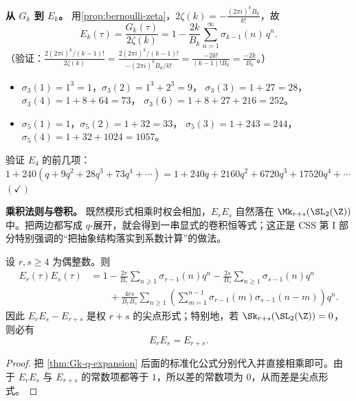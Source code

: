 \textbf{从 $G_k$ 到 $E_k$。}
用\cref{prop:bernoulli-zeta}，$2\zeta(k) = -\frac{(2\pi i)^k B_k}{k!}$，故
\[
  E_k(\tau)
  = \frac{G_k(\tau)}{2\zeta(k)}
  = 1 - \frac{2k}{B_k} \sum_{n=1}^{\infty} \sigma_{k-1}(n)\, q^n.
\]
（验证：$\frac{2(2\pi i)^k/(k-1)!}{2\zeta(k)} = \frac{2(2\pi i)^k/(k-1)!}{-(2\pi i)^k B_k/k!}
= \frac{-2k!}{(k-1)! B_k} = \frac{-2k}{B_k}$。）

\begin{example}
\label{ex:sigma-computation}
\leavevmode
\begin{itemize}
  \item $\sigma_3(1) = 1^3 = 1$，$\sigma_3(2) = 1^3 + 2^3 = 9$，
    $\sigma_3(3) = 1 + 27 = 28$，$\sigma_3(4) = 1 + 8 + 64 = 73$，
    $\sigma_3(6) = 1 + 8 + 27 + 216 = 252$。
  \item $\sigma_5(1) = 1$，$\sigma_5(2) = 1 + 32 = 33$，
    $\sigma_5(3) = 1 + 243 = 244$，$\sigma_5(4) = 1 + 32 + 1024 = 1057$。
\end{itemize}

验证 $E_4$ 的前几项：
$1 + 240(q + 9q^2 + 28q^3 + 73q^4 + \cdots)
= 1 + 240q + 2160q^2 + 6720q^3 + 17520q^4 + \cdots$ \quad $(\checkmark)$
\end{example}

\textbf{乘积法则与卷积。}
既然模形式相乘时权会相加，$E_rE_s$ 自然落在 $\Mk_{r+s}(\SL_2(\Z))$ 中。把两边都写成 $q$-展开，就会得到一串显式的卷积恒等式；这正是 CSS 第 I 部分特别强调的“把抽象结构落实到系数计算”的做法。

\begin{proposition}
\label{prop:eisenstein-convolution}
设 $r,s\ge 4$ 为偶整数。则
\begin{align}
  E_r(\tau)E_s(\tau)
  &= 1
     - \frac{2r}{B_r}\sum_{n\ge 1}\sigma_{r-1}(n)q^n
     - \frac{2s}{B_s}\sum_{n\ge 1}\sigma_{s-1}(n)q^n \\
  &\qquad
     + \frac{4rs}{B_rB_s}
       \sum_{n\ge 1}\left(\sum_{m=1}^{n-1}
       \sigma_{r-1}(m)\sigma_{s-1}(n-m)\right)q^n.
\end{align}
因此 $E_rE_s-E_{r+s}$ 是权 $r+s$ 的尖点形式；特别地，若 $\Sk_{r+s}(\SL_2(\Z))=0$，则必有
\[
  E_rE_s=E_{r+s}.
\]
\end{proposition}

\begin{proof}
把 \cref{thm:Gk-q-expansion} 后面的标准化公式分别代入并直接相乘即可。由于 $E_rE_s$ 与 $E_{r+s}$ 的常数项都等于 $1$，所以差的常数项为 $0$，从而差是尖点形式。
\end{proof}

